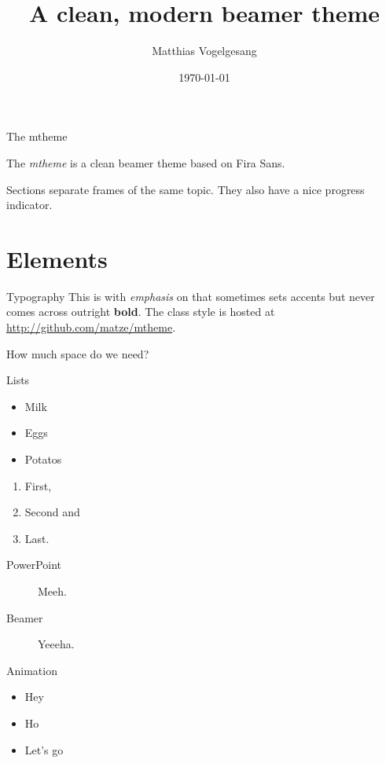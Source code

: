 \documentclass[10pt, compress]{beamer}
\title{A clean, modern beamer theme}
\subtitle{}
\date{\today}
\author{Matthias Vogelgesang}
\institute{Institute for foo bar}
\begin{document}
\maketitle

\begin{frame}{The mtheme}

  The \emph{mtheme} is a clean beamer theme based on Fira Sans.

  Sections separate frames of the same topic. They also have a nice progress
  indicator.

\end{frame}

\section{Elements}

\begin{frame}{Typography}
  This is with \emph{emphasis} on that sometimes sets \alert{accents} but never
  comes across outright \textbf{bold}. The class style is hosted at
  \url{http://github.com/matze/mtheme}.

  How much space do we need?
\end{frame}

\begin{frame}{Lists}
  \begin{itemize}
    \item Milk
    \item Eggs
    \item Potatos
  \end{itemize}

  \begin{enumerate}
    \item First,
    \item Second and
    \item Last.
  \end{enumerate}

  \begin{description}
    \item[PowerPoint] Meeh.
    \item[Beamer] Yeeeha.
  \end{description}
\end{frame}

\begin{frame}{Animation}
  \begin{itemize}[<+- | alert@+>]
    \item \alert<4>{Hey}
    \item Ho
    \item Let's go
  \end{itemize}
\end{frame}
\end{document}
